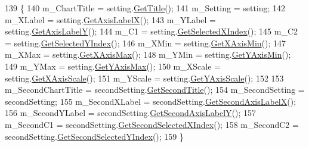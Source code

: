 \begin{DoxyCode}
139                                                                          \{
140         m\_ChartTitle = setting.\hyperlink{class_data_attribute_ade9747a192ba22fe1020e874bff6a48c}{GetTitle}();
141         m\_Setting = setting;
142         m\_XLabel = setting.\hyperlink{class_data_attribute_aecb451704a87d77dd80dbad8a19099d1}{GetAxisLabelX}();
143         m\_YLabel = setting.\hyperlink{class_data_attribute_af5f68794cd0195d42135d5e48120ccc0}{GetAxisLabelY}();
144         m\_C1 = setting.\hyperlink{class_data_attribute_a0f4a54973bc44b0526f78bda945dc81b}{GetSelectedXIndex}();
145         m\_C2 = setting.\hyperlink{class_data_attribute_a82e7519853d9f470ea183dd0c39a03d6}{GetSelectedYIndex}();
146         m\_XMin = setting.\hyperlink{class_data_attribute_afa9da883abc4abad5f64c045de114c50}{GetXAxisMin}();
147         m\_XMax = setting.\hyperlink{class_data_attribute_ada370712422c7cbd21b7be4a0d88caf7}{GetXAxisMax}();
148         m\_YMin = setting.\hyperlink{class_data_attribute_af0786b4de674874c0bb8ca9dbe1519c6}{GetYAxisMin}();
149         m\_YMax = setting.\hyperlink{class_data_attribute_a81243eb8f7008e05e74b0f3571d2f08d}{GetYAxisMax}();
150         m\_XScale = setting.\hyperlink{class_data_attribute_a5a1de25600487aa958a19ce01151fea4}{GetXAxisScale}();
151         m\_YScale = setting.\hyperlink{class_data_attribute_a95259727ce91efc0e0eaa28487d944c5}{GetYAxisScale}();
152         
153         m\_SecondChartTitle = secondSetting.\hyperlink{class_data_attribute_a4079522c93025fce7569eaed585f4aeb}{GetSecondTitle}();
154         m\_SecondSetting = secondSetting;
155         m\_SecondXLabel = secondSetting.\hyperlink{class_data_attribute_a8ace4cb1fee9e2abeabe3efc9a190c8f}{GetSecondAxisLabelX}();
156         m\_SecondYLabel = secondSetting.\hyperlink{class_data_attribute_a6efb7e067317898feefbbf6bd472b998}{GetSecondAxisLabelY}();
157         m\_SecondC1 = secondSetting.\hyperlink{class_data_attribute_a7f501790eee650ddf9ac17c4f63a3995}{GetSecondSelectedXIndex}();
158         m\_SecondC2 = secondSetting.\hyperlink{class_data_attribute_a6f61ad05915f4aa31ad3dba00596da64}{GetSecondSelectedYIndex}();
159     \}
\end{DoxyCode}


